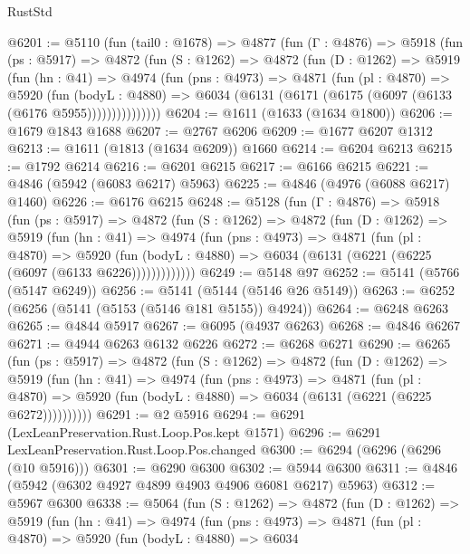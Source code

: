 \begin{lexlean}{RustStd}
\begin{coremodule}
@6201 := @5110
    (fun (tail0 : @1678) =>
    @4877
      (fun (Γ : @4876) =>
      @5918
        (fun (ps : @5917) =>
        @4872
          (fun (S : @1262) =>
          @4872
            (fun (D : @1262) =>
            @5919
              (fun (hn : @41) =>
              @4974
                (fun (pns : @4973) =>
                @4871
                  (fun (pl : @4870) =>
                  @5920
                    (fun (bodyL : @4880) =>
                    @6034 (@6131 (@6171 (@6175 (@6097 (@6133 (@6176 @5955)))))))))))))))
@6204 := @1611 (@1633 (@1634 @1800))
@6206 := @1679 @1843 @1688
@6207 := @2767 @6206
@6209 := @1677 @6207 @1312
@6213 := @1611 (@1813 (@1634 @6209)) @1660
@6214 := @6204 @6213
@6215 := @1792 @6214
@6216 := @6201 @6215
@6217 := @6166 @6215
@6221 := @4846 (@5942 (@6083 @6217) @5963)
@6225 := @4846 (@4976 (@6088 @6217) @1460)
@6226 := @6176 @6215
@6248 := @5128
    (fun (Γ : @4876) =>
    @5918
      (fun (ps : @5917) =>
      @4872
        (fun (S : @1262) =>
        @4872
          (fun (D : @1262) =>
          @5919
            (fun (hn : @41) =>
            @4974
              (fun (pns : @4973) =>
              @4871
                (fun (pl : @4870) =>
                @5920
                  (fun (bodyL : @4880) =>
                  @6034 (@6131 (@6221 (@6225 (@6097 (@6133 @6226)))))))))))))
@6249 := @5148 @97
@6252 := @5141 (@5766 (@5147 @6249))
@6256 := @5141 (@5144 (@5146 @26 @5149))
@6263 := @6252 (@6256 (@5141 (@5153 (@5146 @181 @5155)) @4924))
@6264 := @6248 @6263
@6265 := @4844 @5917
@6267 := @6095 (@4937 @6263)
@6268 := @4846 @6267
@6271 := @4944 @6263 @6132 @6226
@6272 := @6268 @6271
@6290 := @6265
    (fun (ps : @5917) =>
    @4872
      (fun (S : @1262) =>
      @4872
        (fun (D : @1262) =>
        @5919
          (fun (hn : @41) =>
          @4974
            (fun (pns : @4973) =>
            @4871
              (fun (pl : @4870) =>
              @5920 (fun (bodyL : @4880) => @6034 (@6131 (@6221 (@6225 @6272))))))))))
@6291 := @2 @5916
@6294 := @6291 (LexLeanPreservation.Rust.Loop.Pos.kept @1571)
@6296 := @6291 LexLeanPreservation.Rust.Loop.Pos.changed
@6300 := @6294 (@6296 (@6296 (@10 @5916)))
@6301 := @6290 @6300
@6302 := @5944 @6300
@6311 := @4846 (@5942 (@6302 @4927 @4899 @4903 @4906 @6081 @6217) @5963)
@6312 := @5967 @6300
@6338 := @5064
    (fun (S : @1262) =>
    @4872
      (fun (D : @1262) =>
      @5919
        (fun (hn : @41) =>
        @4974
          (fun (pns : @4973) =>
          @4871
            (fun (pl : @4870) =>
            @5920
              (fun (bodyL : @4880) =>
              @6034

\end{coremodule}
\end{lexlean}
